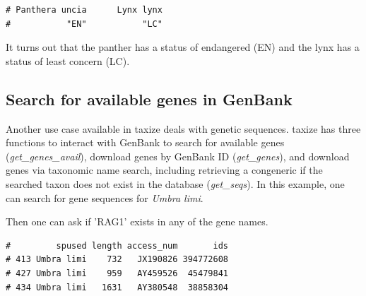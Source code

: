 \begin{sloppypar}
\begin{knitrout}\small

\color{fgcolor}
\begin{kframe}
\begin{alltt}
 \hlkwb{<-} \hlstd{(}\hlstd{(}\hlstd{,} \hlstd{))}
\end{alltt}
\begin{verbatim}
# Panthera uncia      Lynx lynx 
#           "EN"           "LC"
\end{verbatim}
\end{kframe}
\end{knitrout}

It turns out that the panther has a status of endangered (EN) and the lynx has a status of least concern (LC).


\subsection{Search for available genes in GenBank}
Another use case available in taxize deals with genetic sequences. 
taxize has three functions to interact with GenBank to search for available genes \\ (\emph{get\_genes\_avail}), download genes by GenBank ID (\emph{get\_genes}), and download genes via taxonomic name search, including retrieving a congeneric if the searched taxon does not exist in the database (\emph{get\_seqs}). 
In this example, one can search for gene sequences for \emph{Umbra limi}.

\begin{knitrout}\small

\color{fgcolor}\begin{kframe}
\begin{alltt}
 \hlkwb{<-} \hlstd{(} \hlstd{=} \hlstd{,}
                        \hlstd{=} \hlstd{,}
                        \hlstd{=} \hlstd{)}
\end{alltt}
\end{kframe}
\end{knitrout}


Then one can ask if 'RAG1' exists in any of the gene names.

\begin{knitrout}\small
\color{fgcolor}\begin{kframe}
\begin{alltt}
\hlstd{R> out[}\hlstd{(}\hlopt{$}  \hlstd{=} \hlstd{),} \hlopt{-}\hlstd{]}
\end{alltt}
\begin{verbatim}
#         spused length access_num       ids
# 413 Umbra limi    732   JX190826 394772608
# 427 Umbra limi    959   AY459526  45479841
# 434 Umbra limi   1631   AY380548  38858304
\end{verbatim}
\end{kframe}
\end{knitrout}


\end{sloppypar}
